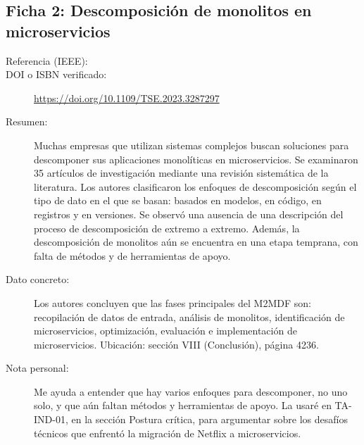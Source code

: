 \subsection{Ficha 2: Descomposición de monolitos en microservicios}
\begin{description}
  \item[Referencia (IEEE):] 
  \item[DOI o ISBN verificado:] \url{https://doi.org/10.1109/TSE.2023.3287297}
  \item[Resumen:] Muchas empresas que utilizan sistemas complejos buscan soluciones para descomponer sus aplicaciones monolíticas en microservicios. Se examinaron 35 artículos de investigación mediante una revisión sistemática de la literatura. Los autores clasificaron los enfoques de descomposición según el tipo de dato en el que se basan: basados en modelos, en código, en registros y en versiones. Se observó una ausencia de una descripción del proceso de descomposición de extremo a extremo. Además, la descomposición de monolitos aún se encuentra en una etapa temprana, con falta de métodos y de herramientas de apoyo.
  \item[Dato concreto:] Los autores concluyen que las fases principales del M2MDF son: recopilación de datos de entrada, análisis de monolitos, identificación de microservicios, optimización, evaluación e implementación de microservicios. Ubicación: sección VIII (Conclusión), página 4236.
  \item[Nota personal:] Me ayuda a entender que hay varios enfoques para descomponer, no uno solo, y que aún faltan métodos y herramientas de apoyo.
La usaré en TA-IND-01, en la sección Postura crítica, para argumentar sobre los desafíos técnicos que enfrentó la migración de Netflix a microservicios.
\end{description}

